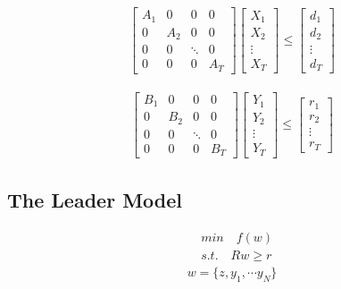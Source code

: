 \documentclass[11pt]{article} %
\begin{document}
\begin{align} 
    \begin{bmatrix}
        A_1 & 0 & 0 & 0\\
        0 & A_2 & 0 & 0\\
        0 & 0 & \ddots  & 0\\
        0 & 0 & 0 & A_T
    \end{bmatrix} 
    \begin{bmatrix}
        X_1\\
        X_2\\
        \vdots \\
        X_T
    \end{bmatrix} \leq
    \begin{bmatrix}
        d_1\\
        d_2\\
        \vdots \\
        d_T
    \end{bmatrix}
\end{align}

\begin{align} 
    \begin{bmatrix}
        B_1 & 0 & 0 & 0\\
        0 & B_2 & 0 & 0\\
        0 & 0 & \ddots  & 0\\
        0 & 0 & 0 & B_T
    \end{bmatrix} 
    \begin{bmatrix}
        Y_1\\
        Y_2\\
        \vdots \\
        Y_T
    \end{bmatrix} \leq
    \begin{bmatrix}
        r_1\\
        r_2\\
        \vdots \\
        r_T
    \end{bmatrix}
\end{align}



\subsection{The Leader Model}
\begin{align}  
    &min \quad f(w)\nonumber\\
    &s.t. \quad Rw \geq r
\end{align}
\begin{align}  
    w = \{z, y_{1}, \cdots y_{N}\}
\end{align}
\end{document}
